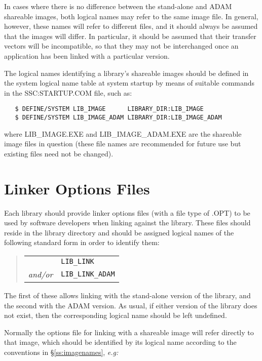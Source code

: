 In cases where there is no difference between the stand-alone and ADAM
shareable images, both logical names may refer to the same image file.
In general, however, these names will refer to different files, and it
should always be assumed that the images will differ.
In particular, it should be assumed that their transfer vectors will be
incompatible, so that they may not be interchanged once an application has
been linked with a particular version.

The logical names identifying a library's shareable images should be defined
in the system logical name table at system startup by means of suitable
commands in the SSC:STARTUP.COM file, such as:

\begin{verbatim}
   $ DEFINE/SYSTEM LIB_IMAGE      LIBRARY_DIR:LIB_IMAGE
   $ DEFINE/SYSTEM LIB_IMAGE_ADAM LIBRARY_DIR:LIB_IMAGE_ADAM
\end{verbatim}

where LIB\_IMAGE.EXE and LIB\_IMAGE\_ADAM.EXE are the shareable image files
in question (these file names are recommended for future use but existing
files need not be changed).


\section{Linker Options Files}

Each library should provide linker options files (with a file type of .OPT) to
be used by software developers when linking against the library.
These files should reside in the library directory and should be assigned
logical names of the following standard form in order to identify them:

\begin{quote}
\begin{tabular}{rl}
& {\tt LIB\_LINK} \\
{\em and/or} & {\tt LIB\_LINK\_ADAM}
\end{tabular}
\end{quote}

The first of these allows linking with the stand-alone version of the
library, and the second with the ADAM version.
As usual, if either version of the library does not exist, then the
corresponding logical name should be left undefined.

Normally the options file for linking with a shareable image will refer
directly to that image, which should be identified by its logical name
according to the conventions in \S\ref{ss:imagenames}, {\em e.g:}


